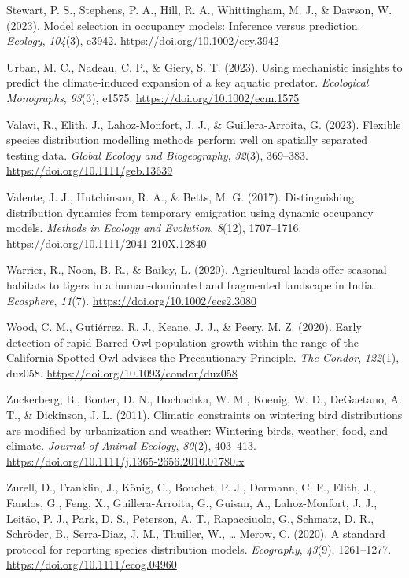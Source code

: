 \documentclass[
]{article}
\newlength{\cslhangindent}
\newenvironment{CSLReferences}[2] %
 {\begin{list}{}{%
  \setlength{\itemindent}{0pt}
  \setlength{\leftmargin}{0pt}
  \setlength{\parsep}{0pt}
  \ifodd #1
   \setlength{\leftmargin}{\cslhangindent}
   \setlength{\itemindent}{-1\cslhangindent}
  \fi
  \setlength{\itemsep}{#2\baselineskip}}}
 {\end{list}}
\begin{document}
\begin{CSLReferences}{1}{0}
Stewart, P. S., Stephens, P. A., Hill, R. A., Whittingham, M. J., \&
Dawson, W. (2023). Model selection in occupancy models: Inference versus
prediction. \emph{Ecology}, \emph{104}(3), e3942.
\url{https://doi.org/10.1002/ecy.3942}

Urban, M. C., Nadeau, C. P., \& Giery, S. T. (2023). Using mechanistic
insights to predict the climate-induced expansion of a key aquatic
predator. \emph{Ecological Monographs}, \emph{93}(3), e1575.
\url{https://doi.org/10.1002/ecm.1575}

Valavi, R., Elith, J., Lahoz-Monfort, J. J., \& Guillera-Arroita, G.
(2023). Flexible species distribution modelling methods perform well on
spatially separated testing data. \emph{Global Ecology and
Biogeography}, \emph{32}(3), 369--383.
\url{https://doi.org/10.1111/geb.13639}

Valente, J. J., Hutchinson, R. A., \& Betts, M. G. (2017).
Distinguishing distribution dynamics from temporary emigration using
dynamic occupancy models. \emph{Methods in Ecology and Evolution},
\emph{8}(12), 1707--1716. \url{https://doi.org/10.1111/2041-210X.12840}

Warrier, R., Noon, B. R., \& Bailey, L. (2020). Agricultural lands offer
seasonal habitats to tigers in a human{-}dominated and fragmented
landscape in India. \emph{Ecosphere}, \emph{11}(7).
\url{https://doi.org/10.1002/ecs2.3080}

Wood, C. M., Gutiérrez, R. J., Keane, J. J., \& Peery, M. Z. (2020).
Early detection of rapid Barred Owl population growth within the range
of the California Spotted Owl advises the Precautionary Principle.
\emph{The Condor}, \emph{122}(1), duz058.
\url{https://doi.org/10.1093/condor/duz058}

Zuckerberg, B., Bonter, D. N., Hochachka, W. M., Koenig, W. D.,
DeGaetano, A. T., \& Dickinson, J. L. (2011). Climatic constraints on
wintering bird distributions are modified by urbanization and weather:
Wintering birds, weather, food, and climate. \emph{Journal of Animal
Ecology}, \emph{80}(2), 403--413.
\url{https://doi.org/10.1111/j.1365-2656.2010.01780.x}

Zurell, D., Franklin, J., König, C., Bouchet, P. J., Dormann, C. F.,
Elith, J., Fandos, G., Feng, X., Guillera-Arroita, G., Guisan, A.,
Lahoz-Monfort, J. J., Leitão, P. J., Park, D. S., Peterson, A. T.,
Rapacciuolo, G., Schmatz, D. R., Schröder, B., Serra-Diaz, J. M.,
Thuiller, W., \ldots{} Merow, C. (2020). A standard protocol for
reporting species distribution models. \emph{Ecography}, \emph{43}(9),
1261--1277. \url{https://doi.org/10.1111/ecog.04960}

\end{CSLReferences}
\end{document}
